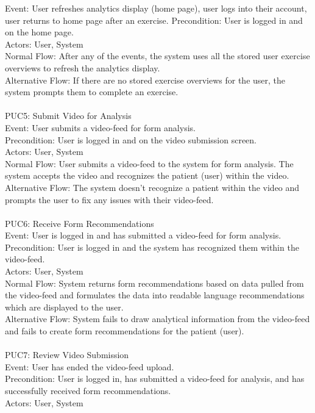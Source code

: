 \documentclass[12pt]{article}
\begin{document}
Event: User refreshes analytics display (home page), user logs into their account, user returns to home page after an exercise.
Precondition: User is logged in and on the home page.\\
Actors: User, System\\
Normal Flow: After any of the events, the system uses all the stored user exercise overviews to refresh the analytics display.\\
Alternative Flow: If there are no stored exercise overviews for the user, the system prompts them to complete an exercise.\\ \\
PUC5: Submit Video for Analysis\\
Event: User submits a video-feed for form analysis.\\
Precondition: User is logged in and on the video submission screen.\\
Actors: User, System\\
Normal Flow: User submits a video-feed to the system for form analysis. The system accepts the video and recognizes the patient (user) within the video.\\
Alternative Flow: The system doesn’t recognize a patient within the video and prompts the user to fix any issues with their video-feed.\\ \\
PUC6: Receive Form Recommendations\\
Event: User is logged in and has submitted a video-feed for form analysis.\\
Precondition: User is logged in and the system has recognized them within the video-feed.\\
Actors: User, System\\
Normal Flow: System returns form recommendations based on data pulled from the video-feed and formulates the data into readable language recommendations which are displayed to the user.\\
Alternative Flow: System fails to draw analytical information from the video-feed and fails to create form recommendations for the patient (user).\\ \\
PUC7: Review Video Submission\\
Event: User has ended the video-feed upload.\\
Precondition: User is logged in, has submitted a video-feed for analysis, and has successfully received form recommendations.\\
Actors: User, System\\
\end{document}
